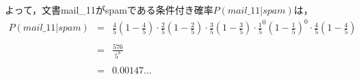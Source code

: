\documentclass[dvipdfmx,autodetect-engine,titlepage]{jsarticle}
\begin{document}
よって，文書mail\_11がspamである条件付き確率\begin{math}
  P(mail\_11|spam)
\end{math}は，
\begin{eqnarray*}
  P(mail\_11| spam) &=& \frac{4}{5}(1-\frac{4}{5}) \cdot \frac{2}{5}(1-\frac{2}{5})\cdot \frac{3}{5}(1-\frac{3}{5})\cdot \frac{1}{5}^0(1-\frac{1}{5})^0\cdot \frac{4}{5} (1-\frac{4}{5} ) \\\\
  &=& \frac{576}{5^8} \\\\
  &=& 0.00147 \dots \\
\end{eqnarray*}



\end{document}
